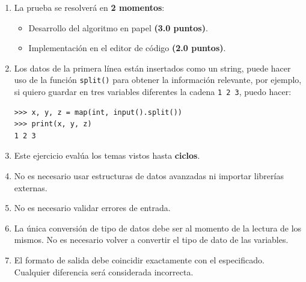 \documentclass[11pt,a4paper]{article}
\begin{document}
\begin{enumerate}
  \item La prueba se resolverá en \textbf{2 momentos}:
        \begin{itemize}
            \item Desarrollo del algoritmo en papel \textbf{(3.0 puntos)}.
            \item Implementación en el editor de código \textbf{(2.0 puntos)}.
        \end{itemize}

  \item Los datos de la primera línea están insertados como un string, puede hacer uso de la función \lstinline[style=pythonstyle]|split()| para obtener la información relevante, por ejemplo, si quiero guardar en tres variables diferentes la cadena \texttt{1 2 3}, puedo hacer:
        \begin{lstlisting}[style=pythonstyle]
>>> x, y, z = map(int, input().split())
>>> print(x, y, z)
1 2 3
        \end{lstlisting}

  \item Este ejercicio evalúa los temas vistos hasta \textbf{ciclos}.

  \item No es necesario usar estructuras de datos avanzadas ni importar librerías externas.

  \item No es necesario validar errores de entrada.

  \item La única conversión de tipo de datos debe ser al momento de la lectura de los mismos. No es necesario volver a convertir el tipo de dato de las variables.

  \item El formato de salida debe coincidir exactamente con el especificado. Cualquier diferencia será considerada incorrecta.
\end{enumerate}
\end{document}
